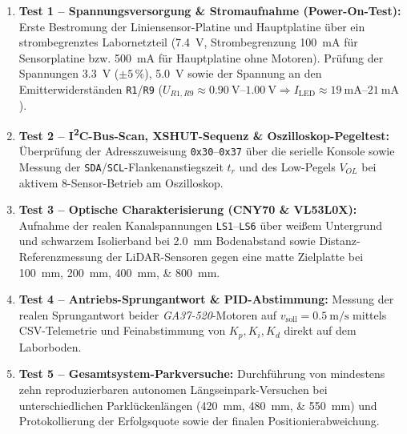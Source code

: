 \begin{enumerate}
  \item \textbf{Test 1 -- Spannungsversorgung \& Stromaufnahme (Power-On-Test):} Erste Bestromung der Liniensensor-Platine und Hauptplatine über ein strombegrenztes Labornetzteil (\qty{7,4}{\volt}, Strombegrenzung \qty{100}{\milli\ampere} für Sensorplatine bzw. \qty{500}{\milli\ampere} für Hauptplatine ohne Motoren). Prüfung der Spannungen \qty{3,3}{\volt} ($\pm 5\,\%$), \qty{5,0}{\volt} sowie der Spannung an den Emitterwiderständen \texttt{R1}/\texttt{R9} ($U_{R1,R9} \approx \qtyrange{0,90}{1,00}{\volt} \Rightarrow I_{\mathrm{LED}} \approx \qtyrange{19}{21}{\milli\ampere}$).
  \item \textbf{Test 2 -- I\textsuperscript{2}C-Bus-Scan, XSHUT-Sequenz \& Oszilloskop-Pegeltest:} Überprüfung der Adresszuweisung \texttt{0x30}--\texttt{0x37} über die serielle Konsole sowie Messung der \texttt{SDA}/\texttt{SCL}-Flankenanstiegszeit $t_r$ und des Low-Pegels $V_{OL}$ bei aktivem 8-Sensor-Betrieb am Oszilloskop.
  \item \textbf{Test 3 -- Optische Charakterisierung (CNY70 \& VL53L0X):} Aufnahme der realen Kanalspannungen \texttt{LS1}--\texttt{LS6} über weißem Untergrund und schwarzem Isolierband bei \qty{2,0}{\milli\meter} Bodenabstand sowie Distanz-Referenzmessung der LiDAR-Sensoren gegen eine matte Zielplatte bei \qtylist{100;200;400;800}{\milli\meter}.
  \item \textbf{Test 4 -- Antriebs-Sprungantwort \& PID-Abstimmung:} Messung der realen Sprungantwort beider \emph{GA37-520}-Motoren auf $v_{\mathrm{soll}} = \qty{0,5}{\meter\per\second}$ mittels CSV-Telemetrie und Feinabstimmung von $K_p, K_i, K_d$ direkt auf dem Laborboden.
  \item \textbf{Test 5 -- Gesamtsystem-Parkversuche:} Durchführung von mindestens zehn reproduzierbaren autonomen Längseinpark-Versuchen bei unterschiedlichen Parklückenlängen (\qtylist{420;480;550}{\milli\meter}) und Protokollierung der Erfolgsquote sowie der finalen Positionierabweichung.
\end{enumerate}

